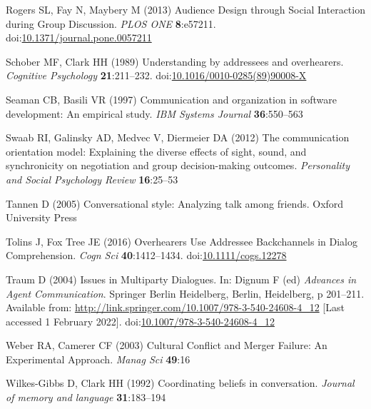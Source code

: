 \documentclass[
  english,
]{article}
\newlength{\cslhangindent}
\newlength{\cslentryspacingunit} %
\newenvironment{CSLReferences}[2] %
 {%
  \setlength{\parindent}{0pt}
  \ifodd #1
  \let\oldpar\par
  \def\par{\hangindent=\cslhangindent\oldpar}
  \fi
  \setlength{\parskip}{#2\cslentryspacingunit}
 }%
 {}
\begin{document}
\begin{CSLReferences}{1}{0}
\leavevmode{}%
Rogers SL, Fay N, Maybery M (2013) Audience {Design} through {Social Interaction} during {Group Discussion}. \emph{PLOS ONE} \textbf{8}:e57211. doi:\href{https://doi.org/10.1371/journal.pone.0057211}{10.1371/journal.pone.0057211}

\leavevmode{}%
Schober MF, Clark HH (1989) Understanding by addressees and overhearers. \emph{Cognitive Psychology} \textbf{21}:211--232. doi:\href{https://doi.org/10.1016/0010-0285(89)90008-X}{10.1016/0010-0285(89)90008-X}

\leavevmode{}%
Seaman CB, Basili VR (1997) Communication and organization in software development: An empirical study. \emph{IBM Systems Journal} \textbf{36}:550--563

\leavevmode{}%
Swaab RI, Galinsky AD, Medvec V, Diermeier DA (2012) The communication orientation model: Explaining the diverse effects of sight, sound, and synchronicity on negotiation and group decision-making outcomes. \emph{Personality and Social Psychology Review} \textbf{16}:25--53

\leavevmode{}%
Tannen D (2005) Conversational style: Analyzing talk among friends. Oxford University Press

\leavevmode{}%
Tolins J, Fox Tree JE (2016) Overhearers {Use Addressee Backchannels} in {Dialog Comprehension}. \emph{Cogn Sci} \textbf{40}:1412--1434. doi:\href{https://doi.org/10.1111/cogs.12278}{10.1111/cogs.12278}

\leavevmode{}%
Traum D (2004) Issues in {Multiparty Dialogues}. In: Dignum F (ed) \emph{Advances in {Agent Communication}}. {Springer Berlin Heidelberg}, {Berlin, Heidelberg}, p 201--211. Available from: \url{http://link.springer.com/10.1007/978-3-540-24608-4_12} {[}Last accessed 1 February 2022{]}. doi:\href{https://doi.org/10.1007/978-3-540-24608-4_12}{10.1007/978-3-540-24608-4\_12}

\leavevmode{}%
Weber RA, Camerer CF (2003) Cultural {Conﬂict} and {Merger Failure}: {An Experimental Approach}. \emph{Manag Sci} \textbf{49}:16

\leavevmode{}%
Wilkes-Gibbs D, Clark HH (1992) Coordinating beliefs in conversation. \emph{Journal of memory and language} \textbf{31}:183--194


\end{CSLReferences}
\end{document}
